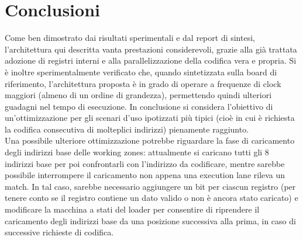 \documentclass[10pt,english, openany]{book}
\begin{document}
\chapter{Conclusioni}

Come ben dimostrato dai risultati sperimentali e dal report di sintesi, l'architettura qui descritta vanta prestazioni considerevoli, grazie alla già trattata adozione di registri interni e alla parallelizzazione della codifica vera e propria. Si è inoltre sperimentalmente verificato che, quando sintetizzata sulla board di riferimento, l’architettura proposta è in grado di operare a frequenze di clock maggiori (almeno di un ordine di grandezza), permettendo quindi ulteriori guadagni nel tempo di esecuzione.
In conclusione si considera l'obiettivo di un’ottimizzazione per gli scenari d’uso ipotizzati più tipici (cioè in cui è richiesta la codifica consecutiva di molteplici indirizzi) pienamente raggiunto.\\
Una possibile ulteriore ottimizzazione potrebbe riguardare la fase di caricamento degli indirizzi base delle working zones: attualmente si caricano tutti gli 8 indirizzi base per poi confrontarli con l’indirizzo da codificare, mentre sarebbe possibile interrompere il caricamento non appena una execution lane rileva un match. In tal caso, sarebbe necessario aggiungere un bit per ciascun registro (per tenere conto se il registro contiene un dato valido o non è ancora stato caricato) e modificare la macchina a stati del loader per consentire di riprendere il caricamento degli indirizzi base da una posizione successiva alla prima, in caso di successive richieste di codifica.




\pagebreak
\end{document}
